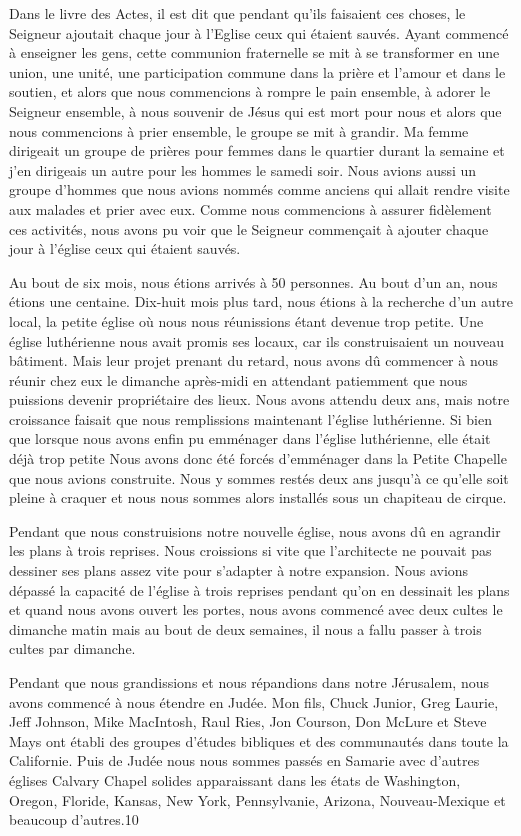 Dans le livre des Actes, il est dit que pendant qu'ils faisaient ces choses, le Seigneur ajoutait chaque jour à l’Eglise
ceux qui étaient sauvés. Ayant commencé à enseigner les gens, cette communion fraternelle se mit à se transformer
en une union, une unité, une participation commune dans la prière et l’amour et dans le soutien, et alors que nous
commencions à rompre le pain ensemble, à adorer le Seigneur ensemble, à nous souvenir de Jésus qui est mort pour
nous et alors que nous commencions à prier ensemble, le groupe se mit à grandir. Ma femme dirigeait un groupe de
prières pour femmes dans le quartier durant la semaine et j’en dirigeais un autre pour les hommes le samedi soir.
Nous avions aussi un groupe d’hommes que nous avions nommés comme anciens qui allait rendre visite aux malades
et prier avec eux. Comme nous commencions à assurer fidèlement ces activités, nous avons pu voir que le Seigneur
commençait à ajouter chaque jour à l’église ceux qui étaient sauvés.

Au bout de six mois, nous étions arrivés à 50 personnes. Au bout d’un an, nous étions une centaine. Dix-huit mois
plus tard, nous étions à la recherche d’un autre local, la petite église où nous nous réunissions étant devenue trop
petite. Une église luthérienne nous avait promis ses locaux, car ils construisaient un nouveau bâtiment. Mais leur
projet prenant du retard, nous avons dû commencer à nous réunir chez eux le dimanche après-midi en attendant
patiemment que nous puissions devenir propriétaire des lieux. Nous avons attendu deux ans, mais notre croissance
faisait que nous remplissions maintenant l'église luthérienne. Si bien que lorsque nous avons enfin pu emménager
dans l'église luthérienne, elle était déjà trop petite Nous avons donc été forcés d'emménager dans la \og Petite Chapelle\fg{}
que nous avions construite. Nous y sommes restés deux ans jusqu’à ce qu'elle soit pleine à craquer et nous nous
sommes alors installés sous un chapiteau de cirque.

Pendant que nous construisions notre nouvelle église, nous avons dû en agrandir les plans à trois reprises. Nous
croissions si vite que l’architecte ne pouvait pas dessiner ses plans assez vite pour s'adapter à notre expansion. Nous
avions dépassé la capacité de l’église à trois reprises pendant qu’on en dessinait les plans et quand nous avons ouvert
les portes, nous avons commencé avec deux cultes le dimanche matin mais au bout de deux semaines, il nous a fallu
passer à trois cultes par dimanche.

Pendant que nous grandissions et nous répandions dans notre Jérusalem, nous avons commencé à nous étendre en
Judée. Mon fils, Chuck Junior, Greg Laurie, Jeff Johnson, Mike MacIntosh, Raul Ries, Jon Courson, Don McLure et
Steve Mays ont établi des groupes d’études bibliques et des communautés dans toute la Californie. Puis de Judée
nous nous sommes passés en Samarie avec d’autres églises Calvary Chapel solides apparaissant dans les états de
Washington, Oregon, Floride, Kansas, New York, Pennsylvanie, Arizona, Nouveau-Mexique et beaucoup d’autres.10

